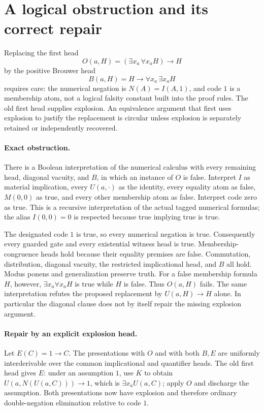 \section{A logical obstruction and its correct repair}

Replacing the first head
\[
 O(a,H)=(\exists x_a\,\forall x_a H)\to H
\]
by the positive Brouwer head
\[
 B(a,H)=H\to\forall x_a\,\exists x_a H
\]
requires care: the numerical negation is $N(A)=I(A,1)$, and code $1$ is a
membership atom, not a logical falsity constant built into the proof rules.
The old first head supplies explosion. An equivalence argument that first
uses explosion to justify the replacement is circular unless explosion is
separately retained or independently recovered.

\paragraph{Exact obstruction.}
There is a Boolean interpretation of the numerical calculus with every
remaining head, diagonal vacuity, and $B$, in which an instance of $O$ is
false. Interpret $I$ as material implication, every $U(a,\cdot)$ as the
identity, every equality atom as false, $M(0,0)$ as true, and every other
membership atom as false. Interpret code zero as true. This is a recursive
interpretation of the actual tagged numerical formulas; the alias
$I(0,0)=0$ is respected because true implying true is true.

The designated code $1$ is true, so every numerical negation is true.
Consequently every guarded gate and every existential witness head is
true. Membership-congruence heads hold because their equality premises
are false. Commutation, distribution, diagonal vacuity, the restricted
implicational head, and $B$ all hold. Modus ponens and generalization
preserve truth. For a false membership formula $H$, however,
$\exists x_a\forall x_aH$ is true while $H$ is false. Thus $O(a,H)$ fails.
The same interpretation refutes the proposed replacement by
$U(a,H)\to H$ alone. In particular the diagonal clause does not by itself
repair the missing explosion argument.

\paragraph{Repair by an explicit explosion head.}
Let $E(C)=1\to C$. The presentations with $O$ and with both $B,E$ are
uniformly interderivable over the common implicational and quantifier
heads. The old first head gives $E$: under an assumption $1$, use $K$ to
obtain $U(a,N(U(a,C)))\to1$, which is $\exists x_aU(a,C)$; apply $O$ and
discharge the assumption. Both presentations now have explosion and
therefore ordinary double-negation elimination relative to code $1$.

